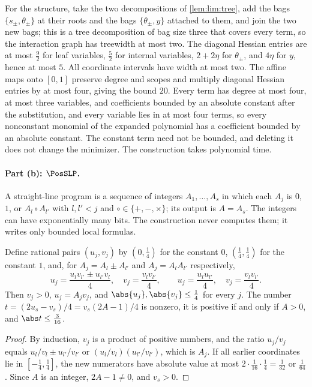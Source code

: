 For the structure, take the two decompositions of \cref{lem:lim:tree}, add
the bags $\{s_\pm,\theta_\pm\}$ at their roots and the bags
$\{\theta_\pm,y\}$ attached to them, and join the two new bags; this is a
tree decomposition of bag size three that covers every term, so the
interaction graph has treewidth at most two. The diagonal Hessian entries
are at most $\frac92$ for leaf variables, $\frac52$ for internal variables,
$2+2\eta$ for $\theta_\pm$, and $4\eta$ for $y$, hence at most $5$. All
coordinate intervals have width at most two. The affine maps onto $[0,1]$
preserve degree and scopes and multiply diagonal Hessian entries by at most
four, giving the bound $20$. Every term has degree at most four, at most
three variables, and coefficients bounded by an absolute constant after the
substitution, and every variable lies in at most four terms, so every
nonconstant monomial of the expanded polynomial has a coefficient bounded by
an absolute constant. The constant term need not be bounded, and deleting it
does not change the minimizer. The construction takes polynomial time.

\paragraph{Part (b): $\PosSLP$.}
A straight-line program is a sequence of integers $A_1,\ldots,A_s$ in which
each $A_j$ is $0$, $1$, or $A_l\circ A_{l'}$ with $l,l'<j$ and
$\circ\in\{+,-,\times\}$; its output is $A=A_s$. The integers can have
exponentially many bits. The construction never computes them; it writes
only bounded local formulas.

\begin{lemma}\label{lem:lim:pairs}
Define rational pairs $(u_j,v_j)$ by $(0,\frac14)$ for the constant $0$,
$(\frac14,\frac14)$ for the constant $1$, and, for $A_j=A_l\pm A_{l'}$ and
$A_j=A_lA_{l'}$ respectively,
\[
 u_j=\frac{u_lv_{l'}\pm u_{l'}v_l}4,\quad v_j=\frac{v_lv_{l'}}4,\qquad
 u_j=\frac{u_lu_{l'}}4,\quad v_j=\frac{v_lv_{l'}}4 .
\]
Then $v_j>0$, $u_j=A_jv_j$, and $\abs{u_j},\abs{v_j}\le\frac14$ for every $j$.
The number $t=(2u_s-v_s)/4=v_s(2A-1)/4$ is nonzero, it is positive if and
only if $A>0$, and $\abs t\le\frac3{16}$.
\end{lemma}

\begin{proof}
By induction, $v_j$ is a product of positive numbers, and the ratio
$u_j/v_j$ equals $u_l/v_l\pm u_{l'}/v_{l'}$ or $(u_l/v_l)(u_{l'}/v_{l'})$,
which is $A_j$. If all earlier coordinates lie in $[-\frac14,\frac14]$, the
new numerators have absolute value at most $2\cdot\frac1{16}\cdot\frac14=
\frac1{32}$ or $\frac1{64}$. Since $A$ is an integer, $2A-1\ne0$, and $v_s>0$.
\end{proof}

